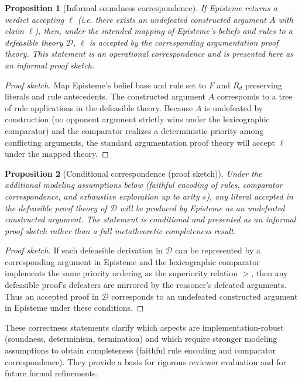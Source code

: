 \documentclass[11pt]{article}
\newtheorem{proposition}{Proposition}
\begin{document}
\begin{proposition}[Informal soundness correspondence]
If Episteme returns a verdict accepting $\ell$ (i.e. there exists an undefeated
constructed argument $A$ with claim $\ell$), then, under the intended mapping of
Episteme's beliefs and rules to a defeasible theory $\mathcal{D}$, $\ell$ is
accepted by the corresponding argumentation proof theory. This statement is an
operational correspondence and is presented here as an informal proof sketch.
\end{proposition}
\begin{proof}[Proof sketch]
Map Episteme's belief base and rule set to $F$ and $R_d$ preserving literals and
rule antecedents. The constructed argument $A$ corresponds to a tree of rule
applications in the defeasible theory. Because $A$ is undefeated by construction
(no opponent argument strictly wins under the lexicographic comparator) and the
comparator realizes a deterministic priority among conflicting arguments, the
standard argumentation proof theory will accept $\ell$ under the mapped theory.
\end{proof}

\begin{proposition}[Conditional correspondence (proof sketch)]
Under the additional modeling assumptions below (faithful encoding of rules,
comparator correspondence, and exhaustive exploration up to arity $s$), any literal
accepted in the defeasible proof theory of $\mathcal{D}$ will be produced by Episteme
as an undefeated constructed argument. The statement is conditional and presented as
an informal proof sketch rather than a full metatheoretic completeness result.
\end{proposition}
\begin{proof}[Proof sketch]
If each defeasible derivation in $\mathcal{D}$ can be represented by a corresponding
argument in Episteme and the lexicographic comparator implements the same priority
ordering as the superiority relation $>$, then any defeasible proof's defeaters are
mirrored by the reasoner's defeated arguments. Thus an accepted proof in $\mathcal{D}$
corresponds to an undefeated constructed argument in Episteme under these conditions.
\end{proof}

These correctness statements clarify which aspects are implementation-robust
(soundness, determinism, termination) and which require stronger modeling
assumptions to obtain completeness (faithful rule encoding and comparator
correspondence). They provide a basis for rigorous reviewer evaluation and for
future formal refinements.
\end{document}
